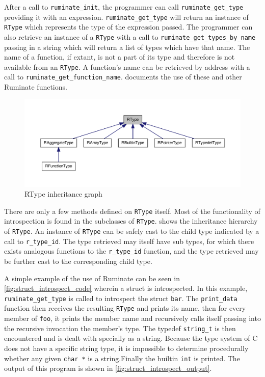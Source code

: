 \documentclass{report}
\begin{document}
After a call to \lstinline|ruminate_init|, the programmer can call
\lstinline|ruminate_get_type| providing it with an expression.
\lstinline|ruminate_get_type| will return an instance of \lstinline|RType| which
represents the type of the expression passed. The programmer can also retrieve
an instance of a \lstinline|RType| with a call to
\lstinline|ruminate_get_types_by_name| passing in a string which will return a
list of types which have that name. The name of a function, if extant, is not a
part of its type and therefore is not available from an \lstinline|RType|.  A
function's name can be retrieved by address with a call to
\lstinline|ruminate_get_function_name|.  documents the use of
these and other Ruminate functions.

\begin{figure}
	\begin{center}
	\includegraphics[width=350pt]{struct_r_type__inherit__graph}
	\end{center}
	\caption{RType inheritance graph}
	\label{fig:rtype_inheritance}
\end{figure}

There are only a few methods defined on \lstinline|RType| itself. Most of the
functionality of introspection is found in the subclasses of \lstinline|RType|.
 shows the inheritance hierarchy of
\lstinline|RType|. An instance of \lstinline|RType| can be safely cast to the
child type indicated by a call to \lstinline|r_type_id|. The type retrieved may
itself have sub types, for which there exists analogous functions to the
\lstinline|r_type_id| function, and the type retrieved may be further cast to
the corresponding child type.

A simple example of the use of Ruminate can be seen in
\cref{fig:struct_introspect_code} wherein a struct is introspected. In this
example, \lstinline|ruminate_get_type| is called to introspect the struct
\lstinline|bar|. The \lstinline|print_data| function then receives the resulting
\lstinline|RType| and prints its name, then for every member of \lstinline|foo|,
it prints the member name and recursively calls itself passing into the
recursive invocation the member's type. The typedef \lstinline|string_t| is then
encountered and is dealt with specially as a string. Because the type system of
C does not have a specific string type, it is impossible to determine
procedurally whether any given \lstinline|char *| is a string.\footnotemark[1]
Finally the builtin \lstinline|int| is printed. The output of this program is
shown in \cref{fig:struct_introspect_output}.
\end{document}

